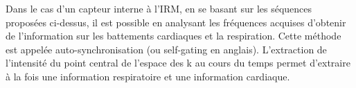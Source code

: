 
Dans le cas d’un capteur interne à l’IRM, en se basant sur les séquences proposées ci-dessus, il est possible en analysant les fréquences acquises d’obtenir de l’information sur les battements cardiaques et la respiration. Cette méthode est appelée auto-synchronisation (ou self-gating en anglais). L’extraction de l’intensité du point central de l’espace des k au cours du temps permet d’extraire à la fois une information respiratoire et une information cardiaque.\\
